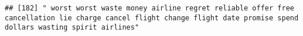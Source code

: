 \documentclass[
]{article}
\begin{document}
\begin{verbatim}
## [182] " worst worst waste money airline regret reliable offer free cancellation lie charge cancel flight change flight date promise spend dollars wasting spirit airlines"                                                                                                                                                                                                                                                                                                                                                                                                                                                                                                                                                                                                                                                                                                                                                                                                                                                                                                                                                                                                                                                                                                                                                                                                                                                                                                                                                                                                                                                                                                                                                                                                                            

\end{verbatim}
\end{document}
